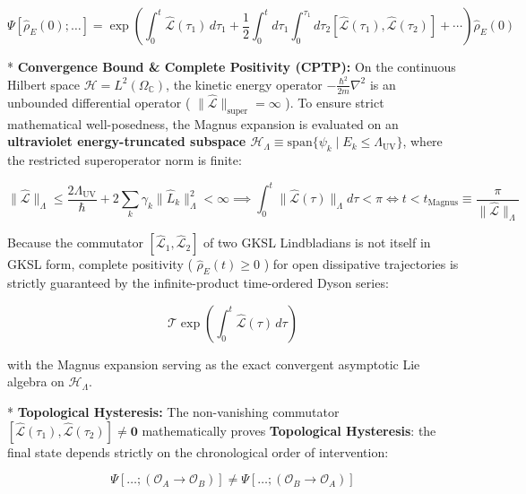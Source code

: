 \documentclass[11pt,a4paper]{article}
\theoremstyle{definition}\newtheorem{definition}{Definition}
\theoremstyle{remark}\newtheorem{remark}{Remark}
\begin{document}
\begin{equation}
\Psi[\hat{\rho}_E(0); \dots] = \exp\left( \int_0^t \hat{\mathcal{L}}(\tau_1) \, d\tau_1 + \frac{1}{2} \int_0^t d\tau_1 \int_0^{\tau_1} d\tau_2 [ \hat{\mathcal{L}}(\tau_1), \hat{\mathcal{L}}(\tau_2) ] + \cdots \right) \hat{\rho}_E(0)
\end{equation}


* \textbf{Convergence Bound \& Complete Positivity (CPTP):} On the continuous Hilbert space $\mathcal{H} = L^2(\Omega_{\mathbb{C}})$, the kinetic energy operator $-\frac{\hbar^2}{2m}\nabla^2$ is an unbounded differential operator ( $\|\hat{\mathcal{L}}\|_{\text{super}} = \infty$ ). To ensure strict mathematical well-posedness, the Magnus expansion is evaluated on an \textbf{ultraviolet energy-truncated subspace $\mathcal{H}_{\Lambda} \equiv \mathrm{span}\{\psi_k \mid E_k \le \Lambda_{\text{UV}}\}$}, where the restricted superoperator norm is finite:


\begin{equation}
\boxed{\|\hat{\mathcal{L}}\|_{\Lambda} \le \frac{2 \Lambda_{\text{UV}}}{\hbar} + 2 \sum_k \gamma_k \|\hat{L}_k\|_{\Lambda}^2 < \infty \implies \int_0^t \|\hat{\mathcal{L}}(\tau)\|_{\Lambda} d\tau < \pi \iff t < t_{\text{Magnus}} \equiv \frac{\pi}{\|\hat{\mathcal{L}}\|_{\Lambda}}}
\end{equation}


Because the commutator $[ \hat{\mathcal{L}}_1, \hat{\mathcal{L}}_2 ]$ of two GKSL Lindbladians is not itself in GKSL form, complete positivity ( $\hat{\rho}_E(t) \ge 0$ ) for open dissipative trajectories is strictly guaranteed by the infinite-product time-ordered Dyson series:


\begin{equation}
\mathcal{T} \exp\left( \int_0^t \hat{\mathcal{L}}(\tau) \, d\tau \right)
\end{equation}


with the Magnus expansion serving as the exact convergent asymptotic Lie algebra on $\mathcal{H}_{\Lambda}$.

* \textbf{Topological Hysteresis:} The non-vanishing commutator $[ \hat{\mathcal{L}}(\tau_1), \hat{\mathcal{L}}(\tau_2) ] \neq \mathbf{0}$ mathematically proves \textbf{Topological Hysteresis}: the final state depends strictly on the chronological order of intervention:


\begin{equation}
\Psi[\dots; (\mathcal{O}_A \to \mathcal{O}_B)] \neq \Psi[\dots; (\mathcal{O}_B \to \mathcal{O}_A)]
\end{equation}
\end{document}
